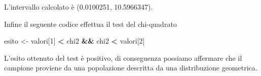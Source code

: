 \documentclass[]{book}
\newenvironment{Shaded}{\begin{snugshade}}{\end{snugshade}}
\newcommand{\DecValTok}[1]{\textcolor[rgb]{0.00,0.00,0.81}{#1}}
\newcommand{\StringTok}[1]{\textcolor[rgb]{0.31,0.60,0.02}{#1}}
\newcommand{\OperatorTok}[1]{\textcolor[rgb]{0.81,0.36,0.00}{\textbf{#1}}}
\newcommand{\NormalTok}[1]{#1}
\begin{document}
L'intervallo calcolato è (0.0100251, 10.5966347).

Infine il seguente codice effettua il test del chi-quadrato

\begin{Shaded}
\begin{Highlighting}[]
\NormalTok{esito <-}\StringTok{ }\NormalTok{valori[}\DecValTok{1}\NormalTok{] }\OperatorTok{<}\StringTok{ }\NormalTok{chi2 }\OperatorTok{&&}\StringTok{ }\NormalTok{chi2 }\OperatorTok{<}\StringTok{ }\NormalTok{valori[}\DecValTok{2}\NormalTok{]}
\end{Highlighting}
\end{Shaded}

L'esito ottenuto del test è positivo, di conseguenza possiamo affermare
che il campione proviene da una popolazione descritta da una
distribuzione geometrica.


\end{document}
